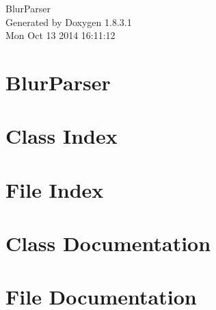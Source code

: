 \documentclass{book}
\begin{document}
\begin{titlepage}
\vspace*{7cm}
\begin{center}
{\Large Blur\-Parser }\\
\vspace*{1cm}
{\large Generated by Doxygen 1.8.3.1}\\
\vspace*{0.5cm}
{\small Mon Oct 13 2014 16:11:12}\\
\end{center}
\end{titlepage}
\clearemptydoublepage
{}
\tableofcontents
\clearemptydoublepage
{}
\chapter{Blur\-Parser}
\label{md_README}

\chapter{Class Index}

\chapter{File Index}

\chapter{Class Documentation}









\chapter{File Documentation}


















\printindex
\end{document}

